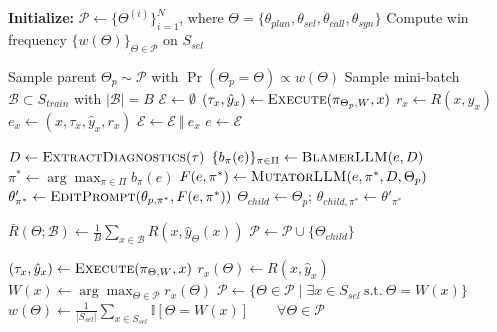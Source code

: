 \documentclass[11pt]{article}
\begin{document}
{\begin{algorithm*}[!t]
\begin{algorithmic}[1]
\State \textbf{Initialize:} $\mathcal{P} \leftarrow \{\Theta^{(i)}\}_{i=1}^{N}$, where $\Theta=\{\theta_{plan},\theta_{sel},\theta_{call},\theta_{syn}\}$
\State Compute win frequency $\{w(\Theta)\}_{\Theta\in\mathcal{P}}$ on $S_{sel}$


    \State Sample parent $\Theta_{p}\sim \mathcal{P}$ with $\Pr(\Theta_{p}=\Theta)\propto w(\Theta)$
    \State Sample mini-batch $\mathcal{B}\subset S_{train}$ with $|\mathcal{B}|=B$
    \State $\mathcal{E} \leftarrow \emptyset$
        \State $(\tau_x,\hat{y}_x)\leftarrow \textsc{Execute}(\pi_{\Theta_{p},W},x)$
        \State $r_x \leftarrow R(x,\hat{y}_x)$
        \State $e_x \leftarrow (x,\tau_x,\hat{y}_x,r_x)$
        \State $\mathcal{E} \leftarrow \mathcal{E}\ \Vert\ e_x$
    \EndFor
    \State $e \leftarrow \mathcal{E}$

    \State $D \leftarrow \textsc{ExtractDiagnostics}(\tau)$
    \State $\{b_{\pi}(e)\}_{\pi\in\Pi} \leftarrow \textsc{BlamerLLM}(e,D)$
    \State $\pi^{*} \leftarrow \arg\max_{\pi\in\Pi} b_{\pi}(e)$
    \State $F(e,\pi^{*}) \leftarrow \textsc{MutatorLLM}(e,\pi^{*},D,\Theta_{p})$
    \State $\theta'_{\pi^{*}} \leftarrow \textsc{EditPrompt}(\theta_{p,\pi^{*}},F(e,\pi^{*}))$
    \State $\Theta_{child} \leftarrow \Theta_{p}$; \quad $\theta_{child,\pi^{*}}\leftarrow \theta'_{\pi^{*}}$

    \State $\bar{R}(\Theta;\mathcal{B}) \leftarrow \frac{1}{B}\sum_{x\in\mathcal{B}} R\!\left(x,\hat{y}_{\Theta}(x)\right)$
        \State $\mathcal{P} \leftarrow \mathcal{P}\cup\{\Theta_{child}\}$
    \EndIf

            \State $(\tau_x,\hat{y}_x)\leftarrow \textsc{Execute}(\pi_{\Theta,W},x)$
            \State $r_x(\Theta) \leftarrow R(x,\hat{y}_x)$
        \EndFor
        \State $W(x)\leftarrow \arg\max_{\Theta\in\mathcal{P}} r_x(\Theta)$
    \EndFor
    \State $\mathcal{P} \leftarrow \{\Theta\in\mathcal{P}\mid \exists x\in S_{sel}\ \text{s.t.}\ \Theta = W(x)\}$
    \State $w(\Theta)\leftarrow \frac{1}{|S_{sel}|}\sum_{x\in S_{sel}}\mathbb{I}[\Theta = W(x)]\qquad \forall \Theta\in\mathcal{P}$


\end{algorithmic}
\end{algorithm*}}
\end{document}
